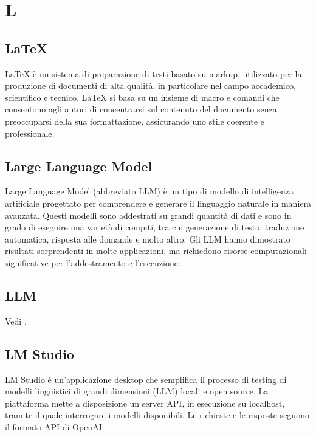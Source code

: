 \section{L}

\vspace{2em}
\subsection*{LaTeX}
\par LaTeX è un sistema di preparazione di testi basato su markup, utilizzato per la produzione di documenti di alta qualità, in particolare nel campo accademico, scientifico e tecnico. LaTeX si basa su un insieme di macro e comandi che consentono agli autori di concentrarsi sul contenuto del documento senza preoccuparsi della sua formattazione, assicurando uno stile coerente e professionale.

\vspace{2em}
\subsection*{Large Language Model}
\par Large Language Model (abbreviato LLM) è un tipo di modello di intelligenza artificiale progettato per comprendere e generare il linguaggio naturale in maniera avanzata. Questi modelli sono addestrati su grandi quantità di dati e sono in grado di eseguire una varietà di compiti, tra cui generazione di testo, traduzione automatica, risposta alle domande e molto altro. Gli LLM hanno dimostrato risultati sorprendenti in molte applicazioni, ma richiedono risorse computazionali significative per l'addestramento e l'esecuzione.

\vspace{2em}
\subsection*{LLM}
\par Vedi .

\vspace{2em}
\subsection*{LM Studio}
\par LM Studio è un'applicazione desktop che semplifica il processo di testing di modelli linguistici di grandi dimensioni (LLM) locali e open source. La piattaforma mette a disposizione un server API, in esecuzione su localhost, tramite il quale interrogare i modelli disponibili. Le richieste e le risposte seguono il formato API di OpenAI.


